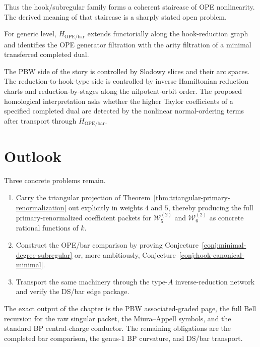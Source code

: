 Thus the hook/subregular family forms a coherent staircase of OPE
nonlinearity.  The derived meaning of that staircase is a sharply stated open
problem.

\begin{conjecture}
\label{conj:hook-canonical-minimal}
For generic level, $H_{\mathrm{OPE/bar}}$ extends functorially along the
hook-reduction graph and identifies the OPE generator filtration with the
arity filtration of a minimal transferred completed dual.
\end{conjecture}

\begin{remark}
The PBW side of the story is controlled by Slodowy slices and their arc spaces.
The reduction-to-hook-type side is controlled by inverse Hamiltonian reduction
charts and reduction-by-stages along the nilpotent-orbit order. The proposed
homological interpretation asks whether the higher Taylor coefficients of a
specified completed dual are detected by the nonlinear normal-ordering terms
after transport through $H_{\mathrm{OPE/bar}}$.
\end{remark}

\section{Outlook}

Three concrete problems remain.

\begin{enumerate}[label=(\roman*)]
\item Carry the triangular projection of
Theorem~\ref{thm:triangular-primary-renormalization} out explicitly in weights
$4$ and $5$, thereby producing the full primary-renormalized coefficient packets
for $\mathcal W_5^{(2)}$ and $\mathcal W_6^{(2)}$ as concrete rational
functions of $k$.
\item Construct the OPE/bar comparison by proving
Conjecture~\ref{conj:minimal-degree-subregular} or, more ambitiously,
Conjecture~\ref{conj:hook-canonical-minimal}.
\item Transport the same machinery through the type-$A$ inverse-reduction
network and verify the DS/bar edge package.
\end{enumerate}

The exact output of the chapter is the PBW associated-graded page, the full
Bell recursion for the raw singular packet, the Miura--Appell symbols, and the
standard BP central-charge conductor.  The remaining obligations are the
completed bar comparison, the genus-$1$ BP curvature, and DS/bar transport.

